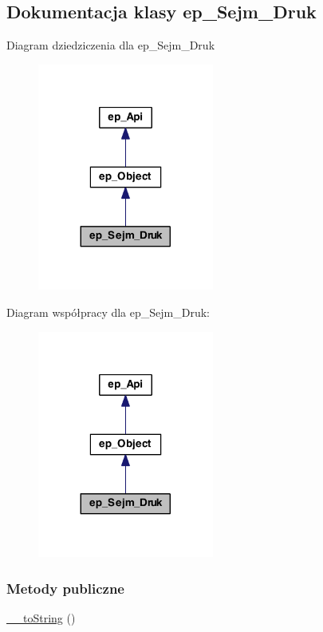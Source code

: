 \hypertarget{classep___sejm___druk}{\subsection{Dokumentacja klasy ep\-\_\-\-Sejm\-\_\-\-Druk}
\label{classep___sejm___druk}
}


Diagram dziedziczenia dla ep\-\_\-\-Sejm\-\_\-\-Druk\nopagebreak
\begin{figure}[H]
\begin{center}
\leavevmode
\includegraphics[width=164pt]{classep___sejm___druk__inherit__graph}
\end{center}
\end{figure}


Diagram współpracy dla ep\-\_\-\-Sejm\-\_\-\-Druk\-:\nopagebreak
\begin{figure}[H]
\begin{center}
\leavevmode
\includegraphics[width=164pt]{classep___sejm___druk__coll__graph}
\end{center}
\end{figure}
\subsubsection*{Metody publiczne}
\begin{DoxyCompactItemize}
\item 
\hyperlink{classep___sejm___druk_a7516ca30af0db3cdbf9a7739b48ce91d}{\-\_\-\-\_\-to\-String} ()
\end{DoxyCompactItemize}
